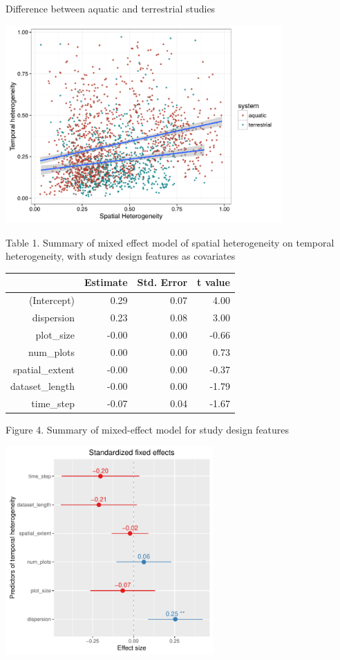 \documentclass[11pt]{article}
\begin{document}
\newpage
Difference between aquatic and terrestrial studies

\includegraphics[width=400px]{aqterr}
\newpage

Table 1. Summary of mixed effect model of spatial heterogeneity on temporal heterogeneity, with study design features as covariates

\FloatBarrier
\begin{table}[ht]
\centering
\begin{tabular}{rrrr}
  \hline
 & Estimate & Std. Error & t value \\ 
  \hline
(Intercept) & 0.29 & 0.07 & 4.00 \\ 
  dispersion & 0.23 & 0.08 & 3.00 \\ 
  plot\_size & -0.00 & 0.00 & -0.66 \\ 
  num\_plots & 0.00 & 0.00 & 0.73 \\ 
  spatial\_extent & -0.00 & 0.00 & -0.37 \\ 
  dataset\_length & -0.00 & 0.00 & -1.79 \\ 
  time\_step & -0.07 & 0.04 & -1.67 \\ 
   \hline
\end{tabular}
\end{table}
\FloatBarrier



Figure 4. Summary of mixed-effect model for study design features 

\includegraphics[width=300px]{designmodel}
\pagebreak
\end{document}
